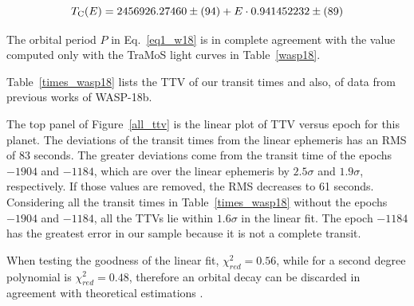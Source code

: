 \begin{equation} \label{eq1_w18}
T_{\rm C}(E)=2456926.27460\pm(94)+E \cdot 0.941452232\pm(89)
\end{equation}

The orbital period $P$ in Eq.~\ref{eq1_w18} is in complete agreement with the value computed only with the TraMoS light curves in Table~\ref{wasp18}.

Table~\ref{times_wasp18} lists the TTV of our transit times and also, of data from previous works \citep{Triaud2010,Hellier2009,Maxted2013b} of WASP-18b. 

The top panel of Figure~\ref{all_ttv} is the linear plot of TTV versus epoch for this planet. The deviations of the transit times from the linear ephemeris has an RMS of 83 seconds. The greater deviations come from the transit time of the epochs $-1904$ and $-1184$, which are over the linear ephemeris by $2.5\sigma$ and $1.9\sigma$, respectively. If those values are removed, the RMS decreases to 61 seconds. Considering all the transit times in Table~\ref{times_wasp18} without the epochs $-1904$ and $-1184$, all the TTVs lie within $1.6\sigma$ in the linear fit. The epoch $-1184$ has the greatest error in our sample because it is not a complete transit.

When testing the goodness of the linear fit, $\chi^{2}_{red} =0.56$, while for a second degree polynomial is $\chi^{2}_{red}=0.48$, therefore an orbital decay can be discarded in agreement with theoretical estimations \citep{CollierCameron2018}.  

